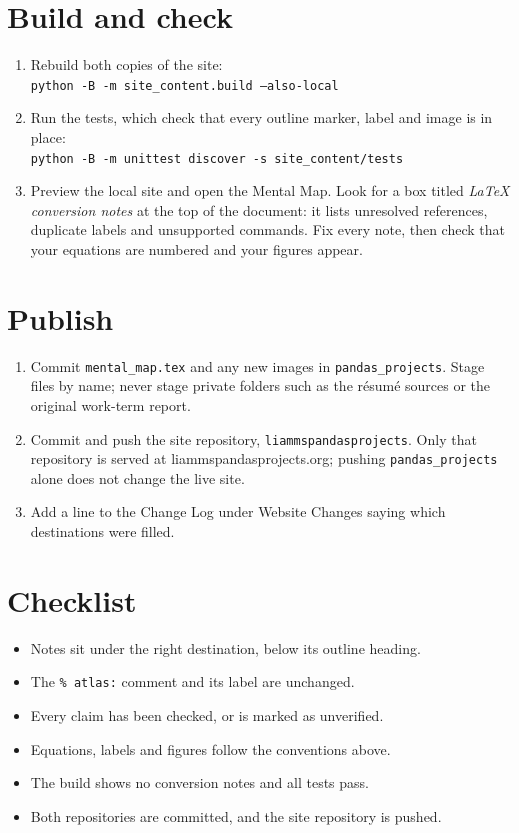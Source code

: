 \documentclass[11pt]{article}
\begin{document}
\section{Build and check}
\begin{enumerate}[label=\arabic*.]
\item Rebuild both copies of the site:\\ \texttt{python -B -m site\_content.build --also-local}
\item Run the tests, which check that every outline marker, label and image is in place:\\ \texttt{python -B -m unittest discover -s site\_content/tests}
\item Preview the local site and open the Mental Map. Look for a box titled \textit{LaTeX conversion notes} at the top of the document: it lists unresolved references, duplicate labels and unsupported commands. Fix every note, then check that your equations are numbered and your figures appear.
\end{enumerate}

\section{Publish}
\begin{enumerate}[label=\arabic*.]
\item Commit \texttt{mental\_map.tex} and any new images in \texttt{pandas\_projects}. Stage files by name; never stage private folders such as the r\'esum\'e sources or the original work-term report.
\item Commit and push the site repository, \texttt{liammspandasprojects}. Only that repository is served at liammspandasprojects.org; pushing \texttt{pandas\_projects} alone does not change the live site.
\item Add a line to the Change Log under Website Changes saying which destinations were filled.
\end{enumerate}

\section{Checklist}
\begin{itemize}
\item Notes sit under the right destination, below its outline heading.
\item The \texttt{\% atlas:} comment and its label are unchanged.
\item Every claim has been checked, or is marked as unverified.
\item Equations, labels and figures follow the conventions above.
\item The build shows no conversion notes and all tests pass.
\item Both repositories are committed, and the site repository is pushed.
\end{itemize}
\end{document}
